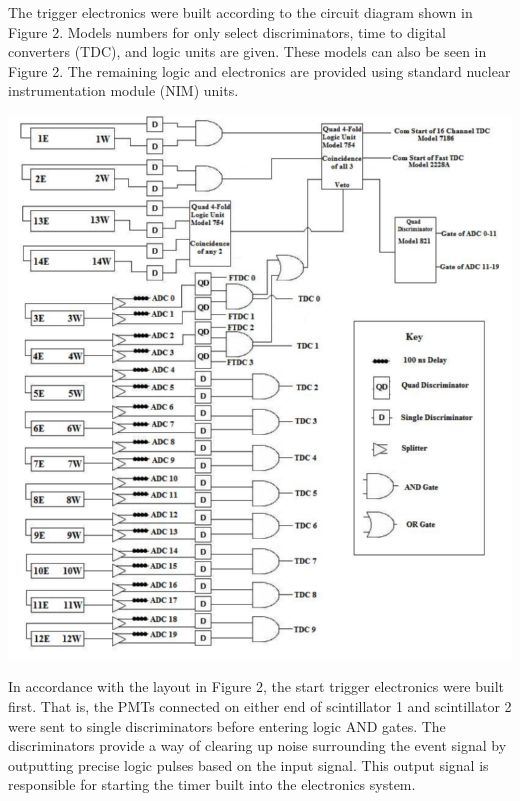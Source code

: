 \documentclass{article}
\begin{document}
The trigger electronics were built according to the circuit diagram shown in Figure 2. Models numbers for only select discriminators, time to digital converters (TDC), and logic units are given. These models can also be seen in Figure 2. The remaining logic and electronics are provided using standard nuclear instrumentation module (NIM) units.

\begin{center}

    \vspace{5mm}

    \includegraphics[width = \textwidth]{Figure2.png}


    \vspace{5mm}

\end{center}

In accordance with the layout in Figure 2, the start trigger electronics were built first. That is, the PMTs connected on either end of scintillator 1 and scintillator 2 were sent to single discriminators before entering logic AND gates. The discriminators provide a way of clearing up noise surrounding the event signal by outputting precise logic pulses based on the input signal. This output signal is responsible for starting the timer built into the electronics system.
\end{document}
